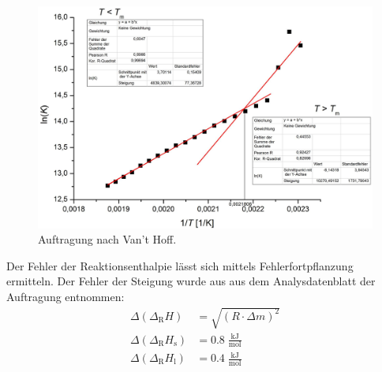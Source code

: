 \documentclass[12pt,a4paper,titlepage,headinclude,bibtotoc]{scrartcl}
\begin{document}
\FloatBarrier
\begin{figure}[h]
\includegraphics[width=13.5cm]{Vant.jpeg}
\caption{Auftragung nach Van't Hoff.}
\end{figure} 
\FloatBarrier
Der Fehler der Reaktionsenthalpie lässt sich mittels Fehlerfortpflanzung ermitteln. Der Fehler der Steigung wurde aus aus dem Analysdatenblatt der Auftragung entnommen:
\begin{align}
\Delta(\Delta_\text{R} H) &= \sqrt{(R\cdot\Delta m)^2}\\
\Delta(\Delta_\text{R} H_{\text{s}}) &= 0.8\;\frac{\text{kJ}}{\text{mol}}\\
\Delta(\Delta_\text{R} H_{\text{l}}) &= 0.4\;\frac{\text{kJ}}{\text{mol}}
\end{align}
\end{document}
